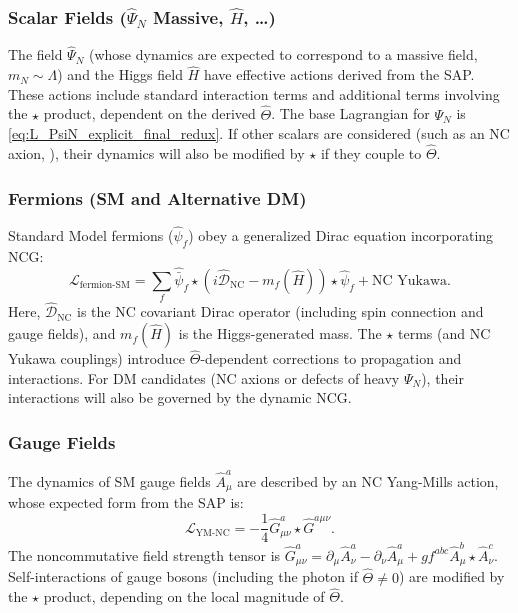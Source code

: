 \documentclass[11pt, a4paper]{article}
\theoremstyle{remark}
\newcommand{\Lag}{\mathcal{L}}
\newcommand{\Op}[1]{\hat{#1}}
\newcommand{\Star}{\star}
\begin{document}
\subsubsection{Scalar Fields (\texorpdfstring{$\Op{\Psi}_N$}{PsiN} Massive, \texorpdfstring{$\Op{H}$}{H}, \dots)}
\label{ssubsec:scalar_fields_final_revised}
The field \( \Op{\Psi}_N \) (whose dynamics are expected to correspond to a massive field, \( m_N \sim \Lambda \)) and the Higgs field \( \Op{H} \) have effective actions derived from the SAP. These actions include standard interaction terms and additional terms involving the \( \star \) product, dependent on the derived \( \Op{\Theta} \). The base Lagrangian for \( \Psi_N \) is \eqref{eq:L_PsiN_explicit_final_redux}. If other scalars are considered (such as an NC axion, ), their dynamics will also be modified by \( \star \) if they couple to \( \Op{\Theta} \).

\subsubsection{Fermions (SM and Alternative DM)}
\label{ssubsec:fermions_final_revised}
Standard Model fermions (\(\Op{\psi}_f\)) obey a generalized Dirac equation incorporating NCG:
\begin{equation}\label{eq:L_fermion_nc_final}
\Lag_{\text{fermion-SM}} = \sum_f \Op{\bar{\psi}}_f \Star (i \Op{\mathcal{D}}_{\text{NC}} - m_f(\Op{H})) \Star \Op{\psi}_f + \text{NC Yukawa}.
\end{equation}
Here, \( \Op{\mathcal{D}}_{\text{NC}} \) is the NC covariant Dirac operator (including spin connection and gauge fields), and \( m_f(\Op{H}) \) is the Higgs-generated mass. The \( \star \) terms (and NC Yukawa couplings) introduce \( \Op{\Theta} \)-dependent corrections to propagation and interactions. For DM candidates (NC axions or defects of heavy \( \Psi_N \)), their interactions will also be governed by the dynamic NCG.

\subsubsection{Gauge Fields}
\label{ssubsec:gauge_fields_final_revised}
The dynamics of SM gauge fields \( \Op{A}_\mu^a \) are described by an NC Yang-Mills action, whose expected form from the SAP is:
\begin{equation}\label{eq:L_YM_NC_final}
 \Lag_{\text{YM-NC}} = -\frac{1}{4} \Op{G}_{\mu\nu}^a \Star \Op{G}^{a \mu\nu}.
\end{equation}
The noncommutative field strength tensor is \( \Op{G}_{\mu\nu}^a = \partial_\mu \Op{A}_\nu^a - \partial_\nu \Op{A}_\mu^a + g f^{abc} \Op{A}_\mu^b \Star \Op{A}_\nu^c \). Self-interactions of gauge bosons (including the photon if \( \Op{\Theta} \neq 0 \)) are modified by the \( \star \) product, depending on the local magnitude of \( \Op{\Theta} \).
\end{document}
